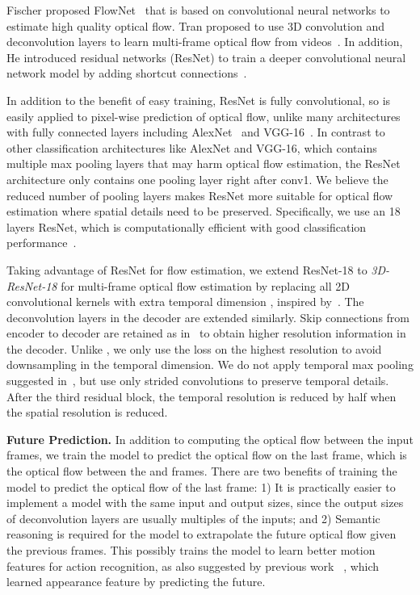 \documentclass[10pt,twocolumn,letterpaper]{article}
\begin{document}
Fischer \etal proposed FlowNet~\cite{FischerDIHHGSCB15} that is based on convolutional neural networks to estimate high quality optical flow. Tran \etal proposed to use 3D convolution and deconvolution layers to learn multi-frame optical flow from videos~\cite{tranbftp16}.
In addition, He \etal introduced residual networks (ResNet) to train a deeper convolutional neural network model by adding shortcut connections~\cite{heZRS15}.

In addition to the benefit of easy training, ResNet is fully convolutional, so is easily applied to pixel-wise prediction of optical flow, unlike many architectures with fully connected layers including AlexNet~\cite{krizhevskySH12} and VGG-16~\cite{simonyanZ14}.
In contrast to other classification architectures like AlexNet and VGG-16, which contains multiple max pooling layers that may harm optical flow estimation, the ResNet architecture only contains one pooling layer right after conv1.
We believe the reduced number of pooling layers makes ResNet more suitable for optical flow estimation where spatial details need to be preserved.
Specifically, we use an 18 layers ResNet, which is computationally efficient with good classification performance~\cite{heZRS15}.


Taking advantage of ResNet for flow estimation, we extend ResNet-18 to \emph{3D-ResNet-18} for multi-frame optical flow estimation by replacing all  2D convolutional kernels with extra temporal dimension , inspired by~\cite{tranbftp16}.
The deconvolution layers in the decoder are extended similarly.
Skip connections from encoder to decoder are retained as in~\cite{FischerDIHHGSCB15} to obtain higher resolution information in the decoder.
Unlike \cite{FischerDIHHGSCB15}, we only use the loss on the highest resolution to avoid downsampling in the temporal dimension. We do not apply temporal max pooling suggested in~\cite{tranBFTP15,tranbftp16}, but use only strided convolutions to preserve temporal details. After the third residual block, the temporal resolution is reduced by half when the spatial resolution is reduced.


\textbf{Future Prediction.}
In addition to computing the optical flow between the  input frames, we train the model to predict the optical flow on the last frame, which is the optical flow between the  and  frames.
There are two benefits of training the model to predict the optical flow of the last frame:
1) It is practically easier to implement a model with the same input and output sizes, since the output sizes of deconvolution layers are usually multiples of the inputs; and
2) Semantic reasoning is required for the model to extrapolate the future optical flow given the previous frames. This possibly trains the model to learn better motion features for action recognition, as also suggested by previous work ~\cite{walker2016uncertain}, which learned appearance feature by predicting the future.
\end{document}
